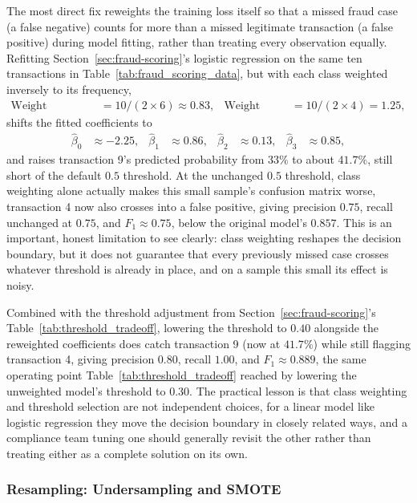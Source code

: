 \documentclass[../ai_in_finance]{subfiles}
\begin{document}
The most direct fix reweights the training loss itself so that a missed fraud case (a false negative) counts for more than a missed legitimate transaction (a false positive) during model fitting, rather than treating every observation equally. Refitting Section~\ref{sec:fraud-scoring}'s logistic regression on the same ten transactions in Table~\ref{tab:fraud_scoring_data}, but with each class weighted inversely to its frequency,
\begin{align*}
\text{Weight (legitimate)} &= 10/(2\times6) \approx 0.83, & \text{Weight (fraud)} &= 10/(2\times4) = 1.25,
\end{align*}
shifts the fitted coefficients to
\begin{align*}
\hat\beta_0 &\approx -2.25, & \hat\beta_1 &\approx 0.86, & \hat\beta_2 &\approx 0.13, & \hat\beta_3 &\approx 0.85,
\end{align*}
and raises transaction 9's predicted probability from $33\%$ to about $41.7\%$, still short of the default $0.5$ threshold. At the unchanged $0.5$ threshold, class weighting alone actually makes this small sample's confusion matrix worse, transaction 4 now also crosses into a false positive, giving precision $0.75$, recall unchanged at $0.75$, and $F_1\approx0.75$, below the original model's $0.857$. This is an important, honest limitation to see clearly: class weighting reshapes the decision boundary, but it does not guarantee that every previously missed case crosses whatever threshold is already in place, and on a sample this small its effect is noisy.

Combined with the threshold adjustment from Section~\ref{sec:fraud-scoring}'s Table~\ref{tab:threshold_tradeoff}, lowering the threshold to $0.40$ alongside the reweighted coefficients does catch transaction 9 (now at $41.7\%$) while still flagging transaction 4, giving precision $0.80$, recall $1.00$, and $F_1\approx0.889$, the same operating point Table~\ref{tab:threshold_tradeoff} reached by lowering the unweighted model's threshold to $0.30$. The practical lesson is that class weighting and threshold selection are not independent choices, for a linear model like logistic regression they move the decision boundary in closely related ways, and a compliance team tuning one should generally revisit the other rather than treating either as a complete solution on its own.

\subsubsection*{Resampling: Undersampling and SMOTE}
\end{document}
